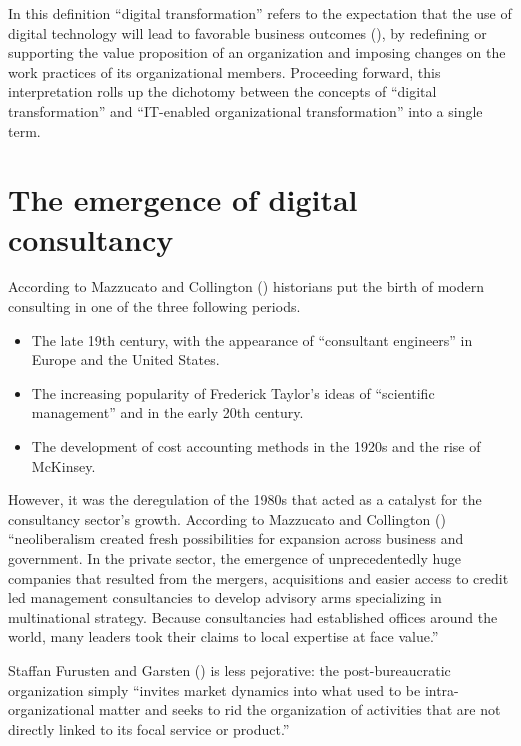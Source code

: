 \documentclass[
  man,floatsintext]{apa6}
\begin{document}
In this definition ``digital transformation'' refers to the expectation that the use of digital technology will lead to favorable business outcomes (), by redefining or supporting the value proposition of an organization and imposing changes on the work practices of its organizational members. Proceeding forward, this interpretation rolls up the dichotomy between the concepts of ``digital transformation'' and ``IT-enabled organizational transformation'' into a single term.

\section{The emergence of digital consultancy}\label{the-emergence-of-digital-consultancy}

According to Mazzucato and Collington () historians put the birth of modern consulting in one of the three following periods.

\begin{itemize}
\item
  The late 19th century, with the appearance of ``consultant engineers'' in Europe and the United States.
\item
  The increasing popularity of Frederick Taylor's ideas of ``scientific management'' and in the early 20th century.
\item
  The development of cost accounting methods in the 1920s and the rise of McKinsey.
\end{itemize}

However, it was the deregulation of the 1980s that acted as a catalyst for the consultancy sector's growth. According to Mazzucato and Collington () ``neoliberalism created fresh possibilities for expansion across business and government. In the private sector, the emergence of unprecedentedly huge companies that resulted from the mergers, acquisitions and easier access to credit led management consultancies to develop advisory arms specializing in multinational strategy. Because consultancies had established offices around the world, many leaders took their claims to local expertise at face value.''

Staffan Furusten and Garsten () is less pejorative: the post-bureaucratic organization simply ``invites market dynamics into what used to be intra-organizational matter and seeks to rid the organization of activities that are not directly linked to its focal service or product.''
\end{document}
